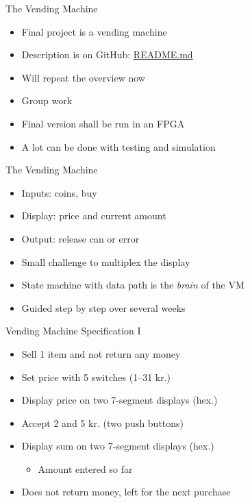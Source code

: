 \begin{frame}[fragile]{The Vending Machine}
\begin{itemize}
\item Final project is a vending machine
\item Description is on GitHub: \href{https://github.com/schoeberl/chisel-lab/tree/master/vending}{README.md}
\item Will repeat the overview now
\item Group work
\item Final version shall be run in an FPGA
\item A lot can be done with testing and simulation
\end{itemize}
\end{frame}

\begin{frame}[fragile]{The Vending Machine}
\begin{itemize}
\item Inputs: coins, buy
\item Display: price and current amount
\item Output: release can or error
\item Small challenge to multiplex the display
\item State machine with data path is the \emph{brain} of the VM
\item Guided step by step over several weeks
\end{itemize}
\end{frame}

\begin{frame}[fragile]{Vending Machine Specification I}
\begin{itemize}
\item Sell 1 item and not return any money
\item Set price with 5 switches (1--31 kr.)
\item Display price on two 7-segment displays (hex.)
\item Accept 2 and 5 kr. (two push buttons)
\item Display sum on two 7-segment displays (hex.)
\begin{itemize}
\item Amount entered so far
\end{itemize}
\item Does not return money, left for the next purchase
\end{itemize}
\end{frame}

